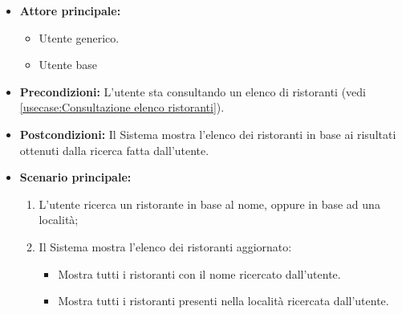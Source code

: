 \label{usecase:Ricerca ristorante}
\begin{itemize}
	\item \textbf{Attore principale:}
    \begin{itemize}
        \item Utente generico.
        \item Utente base
    \end{itemize}
	
	\item \textbf{Precondizioni:} L'utente sta consultando un elenco di ristoranti (vedi \autoref{usecase:Consultazione elenco ristoranti}).

	\item \textbf{Postcondizioni:} Il Sistema mostra l'elenco dei ristoranti in base ai risultati ottenuti dalla ricerca fatta dall'utente.
 
	      
	\item \textbf{Scenario principale:}
	      \begin{enumerate}
		      \item L'utente ricerca un ristorante in base al nome, oppure in base ad una località;

		      \item Il Sistema mostra l'elenco dei ristoranti aggiornato:
		      \begin{itemize}
                \item Mostra tutti i ristoranti con il nome ricercato dall'utente.
                \item Mostra tutti i ristoranti presenti nella località ricercata dall'utente.
              \end{itemize}
	      \end{enumerate}

\end{itemize}


